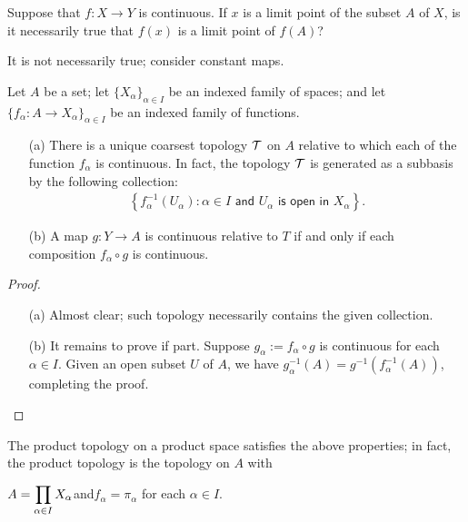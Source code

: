 \begin{prob}
    Suppose that $f: X\rightarrow Y$ is continuous.
    If $x$ is a limit point of the subset $A$ of $X$, is it necessarily true that $f(x)$ is a limit point of $f(A)$?
\end{prob}
\begin{sol}
    It is not necessarily true; consider constant maps.
\end{sol}

\begin{thm}
    Let $A$ be a set; let $\{X_\alpha\}_{\alpha\in I}$ be an indexed family of spaces; and let $\{f_\alpha: A\rightarrow X_\alpha\}_{\alpha\in I}$ be an indexed family of functions.
    \begin{enumerate}
        \item[(a)] There is a unique coarsest topology ${\mathcal{T}}$ on $A$ relative to which each of the function $f_\alpha$ is continuous. In fact, the topology ${\mathcal{T}}$ is generated as a subbasis by the following collection:
        \begin{align*}
            \left\{f_\alpha^{-1}(U_\alpha)
            :
            \alpha\in I\textsf{ and }U_\alpha\textsf{ is open in }X_\alpha\right\}.
        \end{align*}
        \item[(b)] A map $g: Y\rightarrow A$ is continuous relative to $T$ if and only if each composition $f_\alpha\circ g$ is continuous.
    \end{enumerate}
\end{thm}
\begin{proof}
    \begin{enumerate}
        \item[(a)]
            Almost clear; such topology necessarily contains the given collection.
        \item[(b)]
            It remains to prove if part.
            Suppose $g_\alpha:=f_\alpha\circ g$ is continuous for each $\alpha\in I$.
            Given an open subset $U$ of $A$, we have $g_\alpha^{-1}(A)=g^{-1}(f_\alpha^{-1}(A))$, completing the proof.
    \end{enumerate}
\end{proof}
\begin{rmk}
    The product topology on a product space satisfies the above properties; in fact, the product topology is the topology on $A$ with
    \begin{center}
        $\displaystyle{A=\prod_{\alpha\in I}X_\alpha}$\quad and\quad$f_\alpha=\pi_\alpha$ for each $\alpha\in I$.
    \end{center}
\end{rmk}

